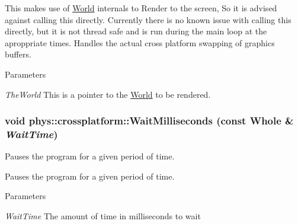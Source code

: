 This makes use of \hyperlink{classphys_1_1World}{World} internals to Render to the screen, So it is advised against calling this directly. Currently there is no known issue with calling this directly, but it is not thread safe and is run during the main loop at the aproppriate times. Handles the actual cross platform swapping of graphics buffers. 
\begin{DoxyParams}{Parameters}
\item[{\em TheWorld}]This is a pointer to the \hyperlink{classphys_1_1World}{World} to be rendered. \end{DoxyParams}
\hypertarget{namespacephys_1_1crossplatform_ab5287fc10a132457a1309e1f5645347a}{
\subsubsection[{WaitMilliseconds}]{\setlength{\rightskip}{0pt plus 5cm}void phys::crossplatform::WaitMilliseconds (const Whole \& {\em WaitTime})}}
\label{d4/d59/namespacephys_1_1crossplatform_ab5287fc10a132457a1309e1f5645347a}


Pauses the program for a given period of time. 

Pauses the program for a given period of time. 
\begin{DoxyParams}{Parameters}
\item[{\em WaitTime}]The amount of time in milliseconds to wait \end{DoxyParams}
